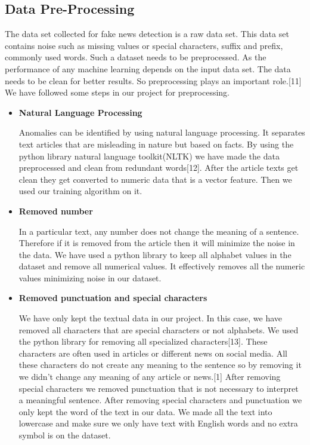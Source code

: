 \documentclass[conference]{IEEEtran}
\begin{document}
\subsection{Data Pre-Processing}
The data set collected for fake news detection is a raw data set. This data set contains noise such as missing values or special characters, suffix and prefix, commonly used words. Such a dataset needs to be preprocessed. As the performance of any machine learning depends on the input data set. The data needs to be clean for better results. So preprocessing plays an important role.[11] We have followed some steps in our project for preprocessing.

\begin{itemize}
\item \textbf{Natural Language Processing}


Anomalies can be identified by using natural language processing. It separates text articles that are misleading in nature but based on facts. By using the python library natural language toolkit(NLTK) we have made the data preprocessed and clean from redundant words[12]. After the article texts get clean they get converted to numeric data that is a vector feature. Then we used our training algorithm on it. 



\item \textbf{Removed number}


In a particular text, any number does not change the meaning of a sentence. Therefore if it is removed from the article then it will minimize the noise in the data. We have used a python library to keep all alphabet values in the dataset and remove all numerical values. It effectively removes all the numeric values minimizing noise in our dataset.


\item \textbf{Removed punctuation and special characters}


We have only kept the textual data in our project. In this case, we have removed all characters that are special characters or not alphabets. We used the python library for removing all specialized characters[13]. These characters are often used in articles or different news on social media. All these characters do not create any meaning to the sentence so by removing it we didn’t change any meaning of any article or news.[1] After removing special characters we removed punctuation that is not necessary to interpret a meaningful sentence. After removing special characters and punctuation we only kept the word of the text in our data. We made all the text into lowercase and make sure we only have text with English words and no extra symbol is on the dataset.


\end{itemize}
\end{document}

